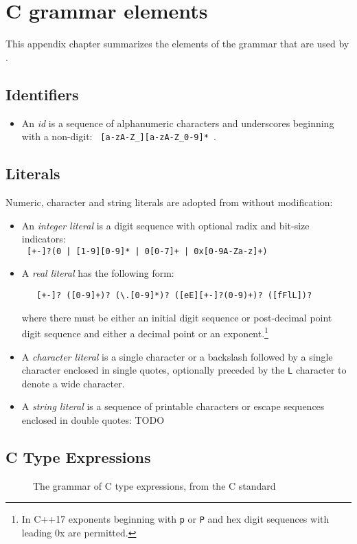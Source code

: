 \section{C grammar elements}
\label{sec:cgrammar}

This appendix chapter summarizes the elements of the \lang grammar that are used by \NAME.

\subsection{Identifiers}

\begin{itemize}
  \item  An \textit{id} is a sequence of alphanumeric characters and underscores beginning with a non-digit:  \lstinline| [a-zA-Z_][a-zA-Z_0-9]* |.
\end{itemize}

\subsection{Literals}

Numeric, character and string literals are adopted from \lang without modification:
\begin{itemize}
  \item An \textit{integer literal} is a digit sequence with optional radix and bit-size indicators: \\ \lstinline! [+-]?(0 | [1-9][0-9]* | 0[0-7]+ | 0x[0-9A-Za-z]+) !
  \item A \textit{real literal} has the following form:
 \begin{lstlisting}
   [+-]? ([0-9]+)? (\.[0-9]*)? ([eE][+-]?(0-9)+)? ([fFlL])?
   \end{lstlisting}
where there must be either an initial digit sequence or post-decimal point digit sequence and either a decimal point or an exponent.\footnote{In C++17 exponents beginning with \lstinline|p| or \lstinline|P| and hex digit sequences with leading 0x are permitted.}
  \item A \textit{character literal} is a single character or a backslash followed by a single character enclosed in single quotes, optionally 
  preceded by the \lstinline|L| character to denote a wide character.
  \item A \textit{string literal} is a sequence of printable characters or escape sequences enclosed in double quotes: TODO
\end{itemize}


\subsection{C Type Expressions}

\begin{figure}[htp]
  \begin{cadre}
    
  \end{cadre}
  \caption{The grammar of C type expressions, from the C standard}
\label{fig:cgram:ctype}
\end{figure}



